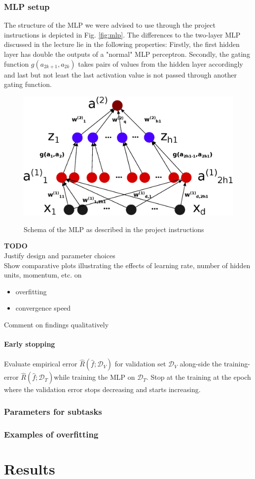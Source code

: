 \subsubsection{MLP setup}
The structure of the MLP we were advised to use through the project instructions is depicted in Fig. \ref{fig:mlp}. The differences to the two-layer MLP discussed in the lecture lie in the following properties: Firstly, the first hidden layer has double the outputs of a "normal" MLP perceptron. Secondly, the gating function $g(a_{2k+1}, a_{2k})$ takes pairs of values from the hidden layer accordingly and last but not least the last activation value is not passed through another gating function.
\begin{figure}[!h]
	\centering
	\includegraphics[width=.8\textwidth]{mlp/mlp.eps}
	\label{mlp}
	\caption{Schema of the MLP as described in the project instructions}
\end{figure}
\newline
\textsc{\textbf{TODO}}\\
Justify design and parameter choices\\
Show comparative plots illustrating the effects of learning rate, number of hidden units, momentum, etc. on\\
\begin{itemize}
\item overfitting
\item convergence speed
\end{itemize}
Comment on findings qualitatively

\paragraph{Early stopping}
Evaluate empirical error $\hat{R}(\hat{f};\mathcal{D}_V)$ for validation set $\mathcal{D}_V$ along-side the training-error $\hat{R}(\hat{f};\mathcal{D}_T)$while training the MLP on $\mathcal{D}_T$. Stop at the training at the epoch where the validation error stops decreasing and starts increasing. 
\subsubsection{Parameters for subtasks}

\subsubsection{Examples of overfitting}

\section{Results}